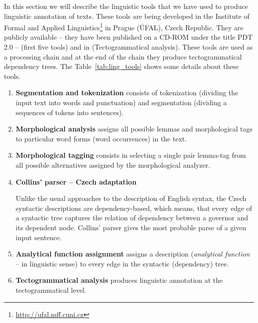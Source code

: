In this section we will describe the linguistic tools that we have used to produce linguistic annotation of texts. These tools are being developed in the Institute of Formal and Applied Linguistics\footnote{\url{http://ufal.mff.cuni.cz}} in Prague (ÚFAL), Czech Republic. They are publicly available -- they have been published on a CD-ROM under the title PDT 2.0 -- \citealt{biblio:PDT20_CD} (first five tools) and in \citealt{biblio:KlTransformationBasedTectogrammatical2006} (Tectogrammatical analysis). These tools are used as a processing chain and at the end of the chain they produce tectogrammatical \citep{biblio:MiBeAnnotationtectogrammatical2006} dependency trees. The Table~\ref{tab:ling_tools} shows some details about these tools.



\begin{enumerate}
	\item \textbf{Segmentation and tokenization} consists of tokenization (dividing the input text into words and  punctuation) and segmentation (dividing a sequences of tokens into sentences).
	
	\item \textbf{Morphological analysis} assigns all possible lemmas and morphological tags to particular word forms (word occurrences) in the text.
	
	\item \textbf{Morphological tagging} consists in selecting a single pair lemma-tag from all possible alternatives assigned by the morphological analyzer.
	
	\item \textbf{Collins' parser -- Czech adaptation} \citep{biblio:collinshbrt_1999}
		
Unlike the usual approaches to the description of English syntax, the Czech syntactic descriptions are dependency-based, which means, that every edge of a syntactic tree captures the relation of dependency between a governor and its dependent node. Collins' parser gives the most probable parse of a given input sentence.
	
	\item \textbf{Analytical function assignment} assigns a description (\emph{analytical function} -- in linguistic sense) to every edge in the syntactic (dependency) tree.
	
	\item \textbf{Tectogrammatical analysis} \citep{biblio:KlTransformationBasedTectogrammatical2006} produces linguistic annotation at the tectogrammatical level.

	 
\end{enumerate}





